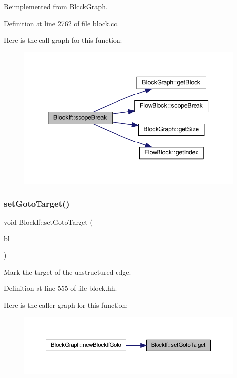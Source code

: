 Reimplemented from \mbox{\hyperlink{class_block_graph_a55618dfd49266bd4185d119f08e8b630}{Block\+Graph}}.



Definition at line 2762 of file block.\+cc.

Here is the call graph for this function\+:
\nopagebreak
\begin{figure}[H]
\begin{center}
\leavevmode
\includegraphics[width=339pt]{class_block_if_afeafc0ad59b47dde90d4b477a2ef7637_cgraph}
\end{center}
\end{figure}
\mbox{\label{class_block_if_a1ae37af7491c4b9d397e6d488d5ce02b}} 
\subsubsection{\texorpdfstring{setGotoTarget()}{setGotoTarget()}}
{\footnotesize\ttfamily void Block\+If\+::set\+Goto\+Target (\begin{DoxyParamCaption}\item[{\mbox{\hyperlink{class_flow_block}{Flow\+Block}} $\ast$}]{bl }\end{DoxyParamCaption})\hspace{0.3cm}{\ttfamily [inline]}}



Mark the target of the unstructured edge. 



Definition at line 555 of file block.\+hh.

Here is the caller graph for this function\+:
\nopagebreak
\begin{figure}[H]
\begin{center}
\leavevmode
\includegraphics[width=350pt]{class_block_if_a1ae37af7491c4b9d397e6d488d5ce02b_icgraph}
\end{center}
\end{figure}


